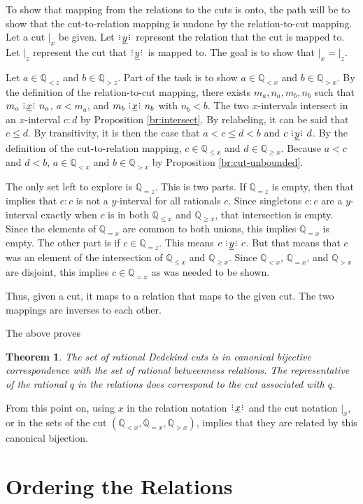 \documentclass[12pt]{article}
\newtheorem{theorem}{Theorem}
\newcommand{\qcut}[2][x]{\ensuremath{\mathbb{Q}_{#2 #1}}}
\newcommand{\qlt}[1][x]{\qcut[#1]{<}}
\newcommand{\qeq}[1][x]{\qcut[#1]{=}}
\newcommand{\qgt}[1][x]{\qcut[#1]{>}}
\newcommand{\qgeq}[1][x]{\qcut[#1]{\geq}}
\newcommand{\qleq}[1][x]{\qcut[#1]{\leq}}
\newcommand{\cut}[1][x]{{\vert}_{#1} }
\newcommand{\yrel}{\xrel[y]}
\begin{document}
To show that mapping from the relations to the cuts is onto, the path will be to show that the cut-to-relation mapping is undone by the relation-to-cut mapping. Let a cut $\cut$ be given. Let $\yrel$ represent the relation that the cut is mapped to. Let $\cut[z]$ represent the cut that $\yrel$ is mapped to. The goal is to show that $\cut = \cut[z]$.  

Let $a \in \qlt[z]$ and $b \in \qgt[z]$. Part of the task is to show $a \in \qlt$ and $b \in \qgt$. By the definition of the relation-to-cut mapping, there exists $m_a, n_a, m_b, n_b$ such that $m_a \xrel n_a$, $a < m_a$, and $m_b \xrel n_b$ with $n_b < b$. The two $x$-intervals intersect in an $x$-interval $c:d$ by  Proposition \ref{br:intersect}. By relabeling, it can be said that $c \leq d$. By transitivity, it is then the case that $a < c \leq d < b$ and $c \yrel d$. By the definition of the cut-to-relation mapping, $c \in \qleq$ and $d \in \qgeq$. Because $a < c$ and $ d < b$, $a \in \qlt$ and $b \in \qgt$ by Proposition \ref{br:cut-unbounded}.

The only set left to explore is $\qeq[z]$. This is two parts. If $\qeq[z]$ is empty, then that implies that $c:c$ is not a $y$-interval for all rationals $c$. Since singletons $c:c$ are a $y$-interval exactly when $c$ is in both $\qleq$ and $\qgeq$, that intersection is empty. Since the elements of $\qeq$ are common to both unions, this implies $\qeq$ is empty. The other part is if $c \in \qeq[z]$. This means $c \yrel c$. But that means that $c$ was an element of the intersection of $\qleq$ and $\qgeq$. Since $\qlt$, $\qeq$, and $\qgt$ are disjoint, this implies $c \in \qeq$ as was needed to be shown. 

Thus, given a cut, it maps to a relation that maps to the given cut. The two mappings are inverses to each other.

The above proves 
\begin{theorem}
    The set of rational Dedekind cuts is in canonical bijective correspondence with the set of rational betweenness relations. The representative of the rational $q$ in the relations does correspond to the cut associated with $q$.
\end{theorem}

From this point on, using $x$ in the relation notation $\xrel$ and the cut notation $\cut$, or in the sets of the cut $(\qlt, \qeq, \qgt)$, implies that they are related by this canonical bijection. 

\section{Ordering the Relations}
\end{document}
